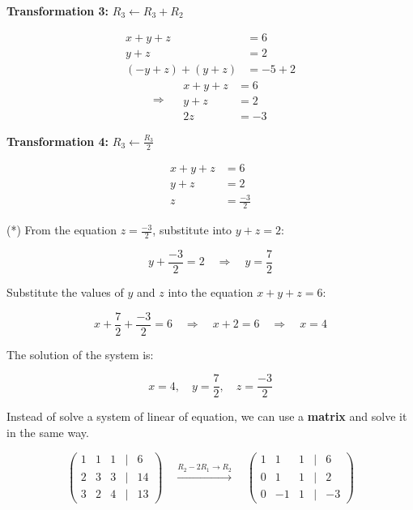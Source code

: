 \documentclass[a4paper,12pt]{article}
\begin{document}
\begin{frame}
    \textbf{Transformation 3:} \( R_3 \leftarrow R_3 + R_2 \)
    
    \[
    \begin{aligned}
        x + y + z &= 6 \\
        y + z &= 2 \\
        (-y + z) + (y + z) &= -5 + 2
    \end{aligned}
    \]
    \[
    \Rightarrow
    \quad \begin{aligned}
        x + y + z &= 6 \\
        y + z &= 2 \\
        2z &= -3
    \end{aligned}
    \]
    
    \textbf{Transformation 4:} \( R_3 \leftarrow \frac{R_3}{2} \)
    
    \[
    \begin{aligned}
        x + y + z &= 6 \\
        y + z &= 2 \\
        z &= \frac{-3}{2}
    \end{aligned}
    \]
    
    \small
    (*)
    From the equation \( z = \frac{-3}{2} \), substitute into \( y + z = 2 \):
    
    \[
    y + \frac{-3}{2} = 2 \quad \Rightarrow \quad y = \frac{7}{2}
    \]
    
    Substitute the values of \( y \) and \( z \) into the equation \( x + y + z = 6 \):
    
    \[
    x + \frac{7}{2} + \frac{-3}{2} = 6 \quad \Rightarrow \quad x + 2 = 6 \quad \Rightarrow \quad x = 4
    \]
    
    \small
    
    The solution of the system is:
    
    \[
    x = 4, \quad y = \frac{7}{2}, \quad z = \frac{-3}{2}
    \]

    Instead of solve a system of linear of equation, we can use a \textbf{matrix} and solve it in the same way.
    


    \[
\begin{pmatrix}
1 & 1 & 1 & \big| & 6 \\
2 & 3 & 3 & \big| & 14 \\
3 & 2 & 4 & \big| & 13
\end{pmatrix}
\quad
\xrightarrow{R_2 - 2R_1 \rightarrow R_2}
\quad
\begin{pmatrix}
1 & 1 & 1 & \big| & 6 \\
0 & 1 & 1 & \big| & 2 \\
0 & -1 & 1 & \big| & -3
\end{pmatrix}
\]



\end{frame}
\end{document}
